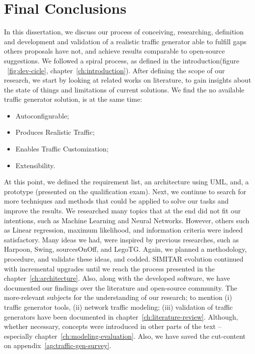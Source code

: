 \chapter{Final Conclusions}\label{ch:conclusion}



In this dissertation, we discuss our process of conceiving, researching, definition and development and validation of a realistic traffic generator able to fulfill gaps others proposals have not, and achieve results comparable to open-source suggestions.  We followed a spiral process, as defined in the introduction(figure ~\ref{fig:dev-cicle}, chapter~\ref{ch:introduction}).  After defining the scope of our research, we start by looking at related works on literature, to gain insights about the state of things and limitations of current solutions. We find the no available traffic generator solution, is at the same time:

\begin{itemize}
\item Autoconfigurable;
\item Produces Realistic Traffic;
\item Enables Traffic Customization;
\item Extensibility.
\end{itemize}

At this point, we defined the requirement list,  an architecture using UML,  and,  a prototype (presented on the qualification exam). Next, we continue to search for more techniques and methods that could be applied to solve our tasks and improve the results.  We researched many topics that at the end did not fit our intentions, such as Machine Learning and Neural Networks. However, others such as Linear regression, maximum likelihood, and information criteria were indeed satisfactory. Many ideas we had, were inspired by previous researches, such as Harpoon, Swing, sourcesOnOff, and LegoTG.  Again, we planned a methodology, procedure, and validate these ideas, and codded.  SIMITAR evolution continued with incremental upgrades until we reach the process presented in the chapter~\ref{ch:architecture}. Also, along with the developed software, we have documented our findings over the literature and open-source community. The more-relevant subjects for the understanding of our research; to mention (i) traffic generator tools, (ii) network traffic modeling; (iii) validation of traffic generators have been documented in chapter~\ref{ch:literature-review}. Although, whether necessary, concepts were introduced in other parts of the text -- especially chapter~\ref{ch:modeling-evaluation}.  Also, we have saved the cut-content on appendix~\ref{ap:traffic-gen-survey}. 

